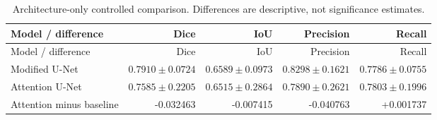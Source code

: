 \small
\begin{longtable}{lrrrr}
\caption{Architecture-only controlled comparison. Differences are descriptive, not significance estimates.}\\
\toprule
Model / difference & Dice & IoU & Precision & Recall\\\midrule
\endfirsthead
\toprule
Model / difference & Dice & IoU & Precision & Recall\\\midrule
\endhead
Modified U-Net & $0.7910\pm0.0724$ & $0.6589\pm0.0973$ & $0.8298\pm0.1621$ & $0.7786\pm0.0755$\\
Attention U-Net & $0.7585\pm0.2205$ & $0.6515\pm0.2864$ & $0.7890\pm0.2621$ & $0.7803\pm0.1996$\\
Attention minus baseline & -0.032463 & -0.007415 & -0.040763 & +0.001737\\
\bottomrule\end{longtable}\normalsize
